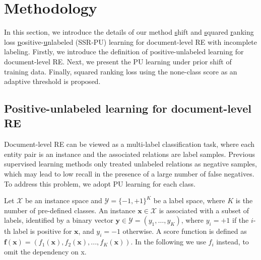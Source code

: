 \documentclass[11pt]{article}
\begin{document}
\section{Methodology}

In this section, we introduce the details of our method \underline{s}hift and \underline{s}quared \underline{r}anking loss \underline{p}ositive-\underline{u}nlabeled (SSR-PU) learning for document-level RE with incomplete labeling. Firstly, we introduce the definition of positive-unlabeled learning for document-level RE. Next, we present the PU learning under prior shift of training data. Finally, squared ranking loss using the none-class score as an adaptive threshold is proposed.

\subsection{Positive-unlabeled learning for document-level RE}

Document-level RE can be viewed as a multi-label classification task, where each entity pair is an instance and the associated relations are label samples. Previous supervised learning methods only treated unlabeled relations as negative samples, which may lead to low recall in the presence of a large number of false negatives. To address this problem, we adopt PU learning \citep{NIPS2014_35051070,pmlr-v37-plessis15} for each class.

Let $\mathcal{X}$ be an instance space and $\mathcal{Y}=\{-1,+1\}^{K}$ be a label space, where $K$ is the number of pre-defined classes. An instance $\boldsymbol{x} \in \mathcal{X}$ is associated with a subset of labels, identified by a binary vector $\boldsymbol{y} \in \mathcal{Y}=\left(y_{1}, \ldots, y_{K}\right)$, where $y_{i}=+1$ if the $i$-th label is positive for $\boldsymbol{x}$, and $y_{i}=-1$ otherwise. A score function is defined as $\boldsymbol{f}(\boldsymbol{x})=(f_{1}(\boldsymbol{x}),f_{2}(\boldsymbol{x}),...,f_{K}(\boldsymbol{x}))$. In the following we use $f_{i}$ instead, to omit the dependency on x. 
\end{document}
